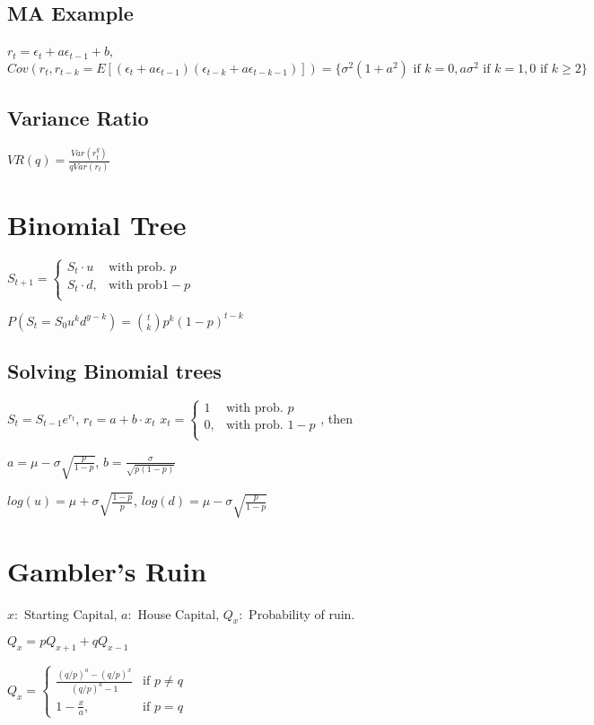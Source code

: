 \subsection{MA Example}
$r_t = \epsilon_t + a \epsilon_{t-1} + b$, $Cov(r_t, r_{t-k} = E[(\epsilon_t + a\epsilon_{t-1})(\epsilon_{t-k} + a\epsilon_{t-k-1})]) = \{\sigma^2(1+a^2) \text{ if } k=0, a\sigma^2 \text{ if }  k=1, 0 \text{ if }  k\geq2\}$

\subsection{Variance Ratio}
$VR(q) = \frac{Var(r_t^q)}{q Var(r_t)}$

\section{Binomial Tree}

$S_{t+1} =
    \begin{cases}
        S_t \cdot u & \text{with prob. } p \\
        S_t \cdot d, & \text{with prob} 1-p \\
    \end{cases}$

$P(S_t = S_0u^kd^{y-k}) = \binom{t}{k} p^k (1-p)^{t-k}$
\subsection{Solving Binomial trees}

$S_t = S_{t-1} e^{r_t}$, $r_t = a+b\cdot x_{t}$
$x_{t} =
    \begin{cases}
        1  & \text{with prob. } p \\
        0 , & \text{with prob. } 1-p \\
    \end{cases}$, then

$a=\mu - \sigma \sqrt{\frac{p}{1-p}}$, $b=\frac{\sigma}{\sqrt{p(1-p)}}$

$log(u) = \mu + \sigma \sqrt{\frac{1-p}{p}}$, $log(d) = \mu - \sigma \sqrt{\frac{p}{1-p}}$

\section{Gambler's Ruin}
$x:$ Starting Capital, $a:$ House Capital, $Q_x:$ Probability of ruin.

$Q_x = pQ_{x+1} + qQ_{x-1}$

$Q_x =
    \begin{cases}
        \frac{(q/p)^a - (q/p)^x }{ (q/p)^a -1 }  & \text{if } p\neq q \\
        1 - \frac{x}{a} , & \text{if } p = q
    \end{cases}$

